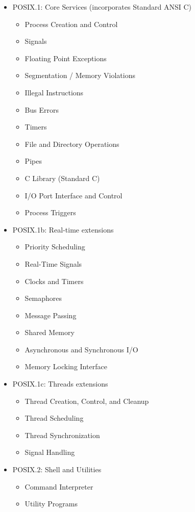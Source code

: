 \begin{itemize}
	\item POSIX.1: Core Services (incorporates Standard ANSI C) 
		\begin{itemize}
			\item Process Creation and Control
			\item Signals
			\item Floating Point Exceptions
			\item Segmentation / Memory Violations
			\item Illegal Instructions
			\item Bus Errors
			\item Timers
			\item File and Directory Operations
			\item Pipes
			\item C Library (Standard C)
			\item I/O Port Interface and Control
			\item Process Triggers
		\end{itemize}
	\item POSIX.1b: Real-time extensions
		\begin{itemize}
			\item Priority Scheduling
			\item Real-Time Signals
			\item Clocks and Timers
			\item Semaphores
			\item Message Passing
			\item Shared Memory
			\item Asynchronous and Synchronous I/O
			\item Memory Locking Interface
		\end{itemize}
	\item POSIX.1c: Threads extensions
		\begin{itemize}
			\item Thread Creation, Control, and Cleanup
			\item Thread Scheduling
			\item Thread Synchronization
			\item Signal Handling	
		\end{itemize}
	\item POSIX.2: Shell and Utilities
		\begin{itemize}
			\item Command Interpreter
			\item Utility Programs
		\end{itemize}
\end{itemize}

